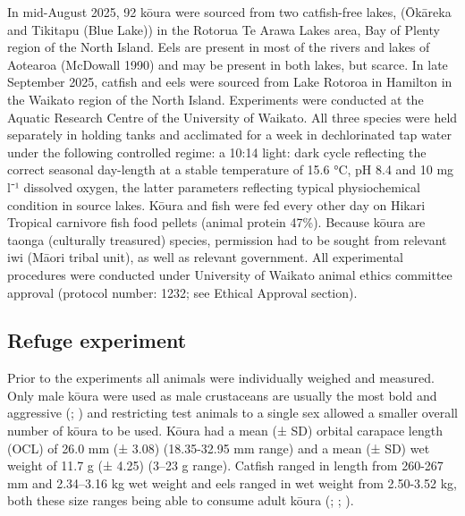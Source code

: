 \documentclass[
  letterpaper,
  DIV=11,
  numbers=noendperiod]{scrartcl}
\begin{document}
In mid-August 2025, 92 kōura were sourced from two catfish-free lakes,
(Ōkāreka and Tikitapu (Blue Lake)) in the Rotorua Te Arawa Lakes area,
Bay of Plenty region of the North Island. Eels are present in most of
the rivers and lakes of Aotearoa (McDowall 1990) and may be present in
both lakes, but scarce. In late September 2025, catfish and eels were
sourced from Lake Rotoroa in Hamilton in the Waikato region of the North
Island. Experiments were conducted at the Aquatic Research Centre of the
University of Waikato. All three species were held separately in holding
tanks and acclimated for a week in dechlorinated tap water under the
following controlled regime: a 10:14 light: dark cycle reflecting the
correct seasonal day-length at a stable temperature of 15.6 °C, pH 8.4
and 10 mg l⁻¹ dissolved oxygen, the latter parameters reflecting typical
physiochemical condition in source lakes. Kōura and fish were fed every
other day on Hikari Tropical carnivore fish food pellets (animal protein
47\%). Because kōura are taonga (culturally treasured) species,
permission had to be sought from relevant iwi (Māori tribal unit), as
well as relevant government. All experimental procedures were conducted
under University of Waikato animal ethics committee approval (protocol
number: 1232; see Ethical Approval section).

\subsection{Refuge experiment}\label{refuge-experiment}

Prior to the experiments all animals were individually weighed and
measured. Only male kōura were used as male crustaceans are usually the
most bold and aggressive (; ) and
restricting test animals to a single sex allowed a smaller overall
number of kōura to be used. Kōura had a mean (± SD) orbital carapace
length (OCL) of 26.0 mm (± 3.08) (18.35-32.95 mm range) and a mean (±
SD) wet weight of 11.7 g (± 4.25) (3--23 g range). Catfish ranged in
length from 260-267 mm and 2.34--3.16 kg wet weight and eels ranged in
wet weight from 2.50-3.52 kg, both these size ranges being able to
consume adult kōura (;
; ).
\end{document}
